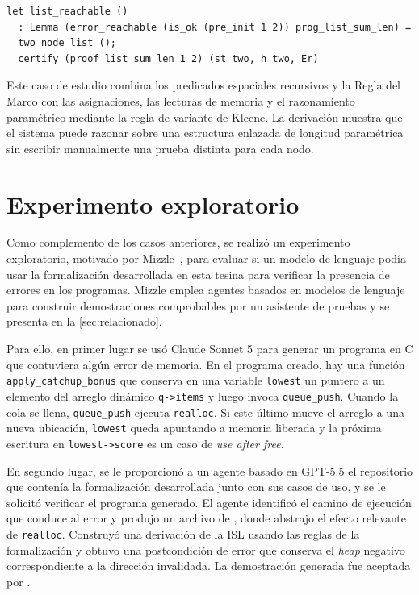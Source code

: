\documentclass[a4paper,	11pt]{report}
\newif\ifdraft\drafttrue
\newcommand{\comm}[3]{\ifdraft{{\color{#1}[#2: #3]}}\fi}
\newcommand{\guido}[1]{\comm{blue}{Guido}{#1}}
\begin{document}
\begin{lstlisting}
let list_reachable ()
  : Lemma (error_reachable (is_ok (pre_init 1 2)) prog_list_sum_len) =
  two_node_list ();
  certify (proof_list_sum_len 1 2) (st_two, h_two, Er)
\end{lstlisting}

Este caso de estudio combina los predicados espaciales recursivos y la Regla del Marco con las asignaciones,
las lecturas de memoria y el razonamiento paramétrico mediante la regla de variante de Kleene.
La derivación muestra que el sistema puede razonar sobre una estructura enlazada de longitud paramétrica
sin escribir manualmente una prueba distinta para cada nodo.

\section{Experimento exploratorio}
\label{sec:experimento-agente}
Como complemento de los casos anteriores,
se realizó un experimento exploratorio,
motivado por Mizzle~\citep{mizzle},
para evaluar si un modelo de lenguaje podía usar la formalización desarrollada en esta tesina para verificar la presencia de errores en los programas.
Mizzle emplea agentes basados en modelos de lenguaje para construir demostraciones comprobables por un asistente de pruebas
y se presenta en la \autoref{sec:relacionado}.

Para ello,
en primer lugar se usó Claude Sonnet 5 para generar un programa en C que contuviera algún error de memoria.
En el programa creado,
hay una función \lstinline|apply_catchup_bonus| que conserva en una variable \lstinline|lowest|
un puntero a un elemento del arreglo dinámico \lstinline|q->items| y luego invoca \lstinline|queue_push|.
Cuando la cola se llena,
\lstinline|queue_push| ejecuta \lstinline|realloc|.
Si este último mueve el arreglo a una nueva ubicación,
\lstinline|lowest| queda apuntando a memoria liberada y la próxima escritura en \lstinline|lowest->score| es un caso de \emph{use after free}.

En segundo lugar,
se le proporcionó a un agente basado en GPT-5.5 el repositorio que contenía la formalización desarrollada junto con sus casos de uso,
y se le solicitó verificar el programa generado.
El agente identificó el camino de ejecución que conduce al error y produjo un archivo de \fstar{},
donde abstrajo el efecto relevante de \lstinline|realloc|.
Construyó una derivación de la ISL usando las reglas de la formalización
y obtuvo una postcondición de error que conserva el \emph{heap} negativo correspondiente a la dirección invalidada.
La demostración generada fue aceptada por \fstar{}.
\end{document}

